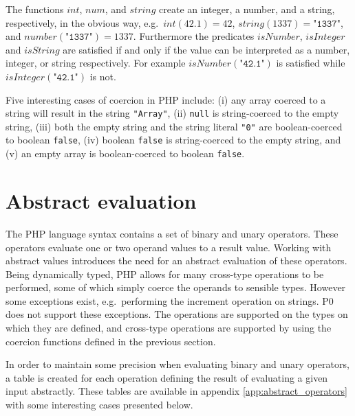 The functions $\mathit{int}$, $\mathit{num}$, and $\mathit{string}$ create an integer, a number, and a string, respectively, in the obvious way, e.g.\ $\mathit{int}(42.1) = 42$, $\mathit{string}(1337) = \texttt{"1337"}$, and $\mathit{number}(\texttt{"1337"}) = 1337$. Furthermore the predicates $\mathit{isNumber}$, $\mathit{isInteger}$ and $\mathit{isString}$ are satisfied if and only if the value can be interpreted as a number, integer, or string respectively. For example $\mathit{isNumber}(\texttt{"42.1"})$ is satisfied while $\mathit{isInteger}(\texttt{"42.1"})$ is not.

Five interesting cases of coercion in PHP include: (i) any array coerced to a string will result in the string \texttt{"Array"}, (ii) \texttt{null} is string-coerced to the empty string, (iii) both the empty string and the string literal \texttt{"0"} are boolean-coerced to boolean \texttt{false}, (iv) boolean \texttt{false} is string-coerced to the empty string, and (v) an empty array is boolean-coerced to boolean \texttt{false}.


\section{Abstract evaluation}
\label{sec:abseval}
The PHP language syntax contains a set of binary and unary operators. These operators evaluate one or two operand values to a result value. Working with abstract values introduces the need for an abstract evaluation of these operators. Being dynamically typed, PHP allows for many cross-type operations to be performed, some of which simply coerce the operands to sensible types. However some exceptions exist, e.g.\ performing the increment operation on strings. P0 does not support these exceptions. The operations are supported on the types on which they are defined, and cross-type operations are supported by using the coercion functions defined in the previous section.

In order to maintain some precision when evaluating binary and unary operators, a table is created for each operation defining the result of evaluating a given input abstractly. These tables are available in appendix \ref{app:abstract_operators} with some interesting cases presented below.



